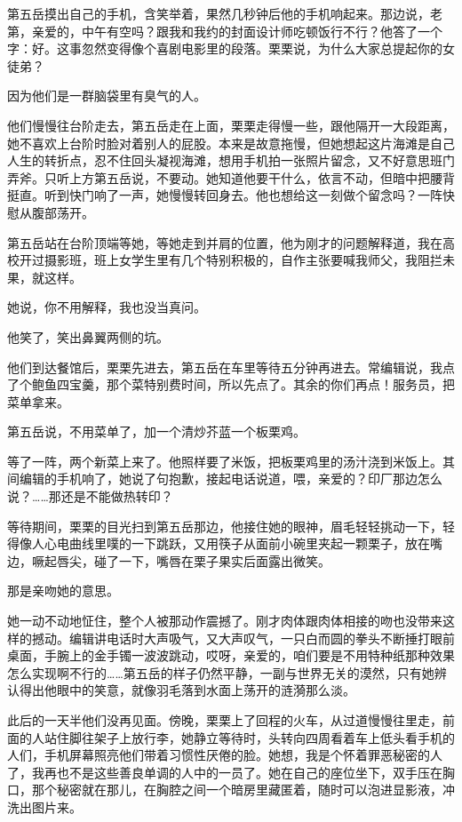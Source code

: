 \documentclass[lang=cn,newtx,12pt,scheme=chinese]{elegantbook}
\begin{document}
第五岳摸出自己的手机，含笑举着，果然几秒钟后他的手机响起来。那边说，老第，亲爱的，中午有空吗？跟我和我约的封面设计师吃顿饭行不行？他答了一个字：好。这事忽然变得像个喜剧电影里的段落。栗栗说，为什么大家总提起你的女徒弟？

因为他们是一群脑袋里有臭气的人。

他们慢慢往台阶走去，第五岳走在上面，栗栗走得慢一些，跟他隔开一大段距离，她不喜欢上台阶时脸对着别人的屁股。本来是故意拖慢，但她想起这片海滩是自己人生的转折点，忍不住回头凝视海滩，想用手机拍一张照片留念，又不好意思班门弄斧。只听上方第五岳说，不要动。她知道他要干什么，依言不动，但暗中把腰背挺直。听到快门响了一声，她慢慢转回身去。他也想给这一刻做个留念吗？一阵快慰从腹部荡开。

第五岳站在台阶顶端等她，等她走到并肩的位置，他为刚才的问题解释道，我在高校开过摄影班，班上女学生里有几个特别积极的，自作主张要喊我师父，我阻拦未果，就这样。

她说，你不用解释，我也没当真问。

他笑了，笑出鼻翼两侧的坑。

他们到达餐馆后，栗栗先进去，第五岳在车里等待五分钟再进去。常编辑说，我点了个鲍鱼四宝羹，那个菜特别费时间，所以先点了。其余的你们再点！服务员，把菜单拿来。

第五岳说，不用菜单了，加一个清炒芥蓝一个板栗鸡。

等了一阵，两个新菜上来了。他照样要了米饭，把板栗鸡里的汤汁浇到米饭上。其间编辑的手机响了，她说了句抱歉，接起电话说道，喂，亲爱的？印厂那边怎么说？……那还是不能做热转印？

等待期间，栗栗的目光扫到第五岳那边，他接住她的眼神，眉毛轻轻挑动一下，轻得像人心电曲线里噗的一下跳跃，又用筷子从面前小碗里夹起一颗栗子，放在嘴边，噘起唇尖，碰了一下，嘴唇在栗子果实后面露出微笑。

那是亲吻她的意思。

她一动不动地怔住，整个人被那动作震撼了。刚才肉体跟肉体相接的吻也没带来这样的撼动。编辑讲电话时大声吸气，又大声叹气，一只白而圆的拳头不断捶打眼前桌面，手腕上的金手镯一波波跳动，哎呀，亲爱的，咱们要是不用特种纸那种效果怎么实现啊不行的……第五岳的样子仍然平静，一副与世界无关的漠然，只有她辨认得出他眼中的笑意，就像羽毛落到水面上荡开的涟漪那么淡。

此后的一天半他们没再见面。傍晚，栗栗上了回程的火车，从过道慢慢往里走，前面的人站住脚往架子上放行李，她静立等待时，头转向四周看着车上低头看手机的人们，手机屏幕照亮他们带着习惯性厌倦的脸。她想，我是个怀着罪恶秘密的人了，我再也不是这些善良单调的人中的一员了。她在自己的座位坐下，双手压在胸口，那个秘密就在那儿，在胸腔之间一个暗房里藏匿着，随时可以泡进显影液，冲洗出图片来。
\end{document}
